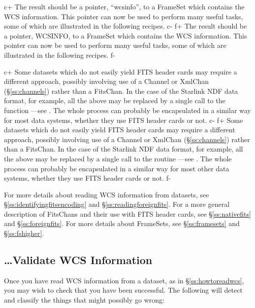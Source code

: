 \documentclass[twoside,11pt]{starlink}
\providecommand{\secref}[1]{\S\ref{#1}}
\begin{document}
c+
The result should be a pointer, ``wcsinfo'', to a FrameSet which
contains the WCS information. This pointer can now be used to perform
many useful tasks, some of which are illustrated in the following
recipes.
c-
f+
The result should be a pointer, WCSINFO, to a FrameSet which contains
the WCS information. This pointer can now be used to perform many
useful tasks, some of which are illustrated in the following recipes.
f-

c+
Some datasets which do not easily yield FITS header cards may require
a different approach, possibly involving use of a Channel or XmlChan
(\secref{ss:channels}) rather than a FitsChan. In the case of the
Starlink NDF data format, for example, all the above may be replaced
by a single call to the function
---see .  The
whole process can probably be encapsulated in a similar way for
most data systems, whether they use FITS header cards or not.
c-
f+
Some datasets which do not easily yield FITS header cards may require
a different approach, possibly involving use of a Channel or XmlChan
(\secref{ss:channels}) rather than a FitsChan. In the case of the
Starlink NDF data format, for example, all the above may be replaced
by a single call to the routine
---see .  The
whole process can probably be encapsulated in a similar way for most
other data systems, whether they use FITS header cards or not.
f-

For more details about reading WCS information from datasets, see
\secref{ss:identifyingfitsencoding} and
\secref{ss:readingforeignfits}. For a more general description of
FitsChans and their use with FITS header cards, see
\secref{ss:nativefits} and \secref{ss:foreignfits}. For more details
about FrameSets, see \secref{ss:framesets} and \secref{ss:fshigher}.

\subsection{\ldots Validate WCS Information}

Once you have read WCS information from a dataset, as in
\secref{ss:howtoreadwcs}, you may wish to check that you have been
successful. The following will detect and classify the things that
might possibly go wrong:
\end{document}
